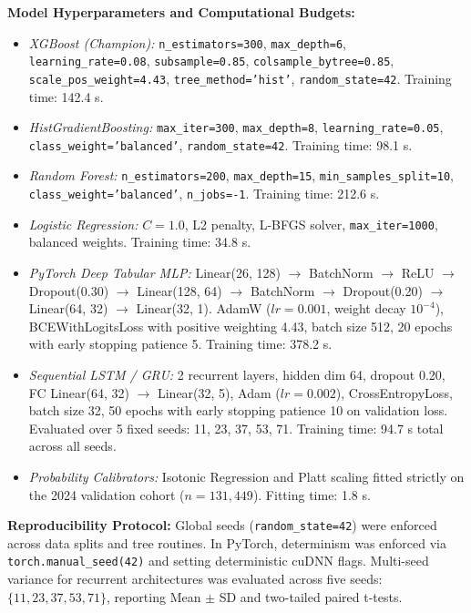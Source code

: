 \documentclass[runningheads]{llncs}
\begin{document}
\textbf{Model Hyperparameters and Computational Budgets:}
\begin{itemize}
    \item \textit{XGBoost (Champion):} \texttt{n\_estimators=300}, \texttt{max\_depth=6}, \texttt{learning\_rate=0.08}, \texttt{subsample=0.85}, \texttt{colsample\_bytree=0.85}, \texttt{scale\_pos\_weight=4.43}, \texttt{tree\_method='hist'}, \texttt{random\_state=42}. Training time: 142.4 s.
    \item \textit{HistGradientBoosting:} \texttt{max\_iter=300}, \texttt{max\_depth=8}, \texttt{learning\_rate=0.05}, \texttt{class\_weight='balanced'}, \texttt{random\_state=42}. Training time: 98.1 s.
    \item \textit{Random Forest:} \texttt{n\_estimators=200}, \texttt{max\_depth=15}, \texttt{min\_samples\_split=10}, \texttt{class\_weight='balanced'}, \texttt{n\_jobs=-1}. Training time: 212.6 s.
    \item \textit{Logistic Regression:} $C=1.0$, L2 penalty, L-BFGS solver, \texttt{max\_iter=1000}, balanced weights. Training time: 34.8 s.
    \item \textit{PyTorch Deep Tabular MLP:} Linear(26, 128) $\to$ BatchNorm $\to$ ReLU $\to$ Dropout(0.30) $\to$ Linear(128, 64) $\to$ BatchNorm $\to$ Dropout(0.20) $\to$ Linear(64, 32) $\to$ Linear(32, 1). AdamW ($lr=0.001$, weight decay $10^{-4}$), BCEWithLogitsLoss with positive weighting 4.43, batch size 512, 20 epochs with early stopping patience 5. Training time: 378.2 s.
    \item \textit{Sequential LSTM / GRU:} 2 recurrent layers, hidden dim 64, dropout 0.20, FC Linear(64, 32) $\to$ Linear(32, 5), Adam ($lr=0.002$), CrossEntropyLoss, batch size 32, 50 epochs with early stopping patience 10 on validation loss. Evaluated over 5 fixed seeds: 11, 23, 37, 53, 71. Training time: 94.7 s total across all seeds.
    \item \textit{Probability Calibrators:} Isotonic Regression and Platt scaling fitted strictly on the 2024 validation cohort ($n=131,449$). Fitting time: 1.8 s.
\end{itemize}

\textbf{Reproducibility Protocol:} Global seeds (\texttt{random\_state=42}) were enforced across data splits and tree routines. In PyTorch, determinism was enforced via \texttt{torch.manual\_seed(42)} and setting deterministic cuDNN flags. Multi-seed variance for recurrent architectures was evaluated across five seeds: $\{11, 23, 37, 53, 71\}$, reporting Mean $\pm$ SD and two-tailed paired t-tests.
\end{document}
